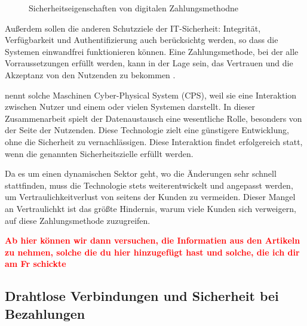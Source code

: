 \vfill
\begin{figure}[htb]
    \caption{Sicherheitseigenschaften von digitalen Zahlungsmethodne}
    \label{fig:refark_HARE}
\end{figure}
\vfill

Außerdem sollen die anderen Schutzziele der IT-Sicherheit: Integrität, Verfügbarkeit und
Authentifizierung auch berücksichtg werden, so dass die Systemen einwandfrei funktionieren können.
Eine Zahlungsmethode, bei der alle Vorraussetzungen erfüllt werden, kann in der Lage sein, das Vertrauen und 
die Akzeptanz von den Nutzenden zu bekommen \cite{refart:HARE}. 


\cite{inbook:MHNS} nennt solche Maschinen Cyber-Physical System (CPS), weil sie eine Interaktion zwischen 
Nutzer und einem oder vielen Systemen darstellt. In dieser Zusammenarbeit spielt der Datenaustausch 
eine wesentliche Rolle, besonders von der Seite der Nutzenden. Diese Technologie zielt eine günstigere 
Entwicklung, ohne die Sicherheit zu vernachlässigen. Diese Interaktion findet erfolgereich statt, 
wenn die genannten Sicherheitszielle erfüllt werden.


Da es um einen dynamischen Sektor geht, wo die Änderungen sehr schnell stattfinden, \cite{refip:NYRS} 
muss die Technologie stets weiterentwickelt und angepasst werden, um Vertraulichkeitverlust von seitens
der Kunden zu vermeiden. Dieser Mangel an Vertraulichkt ist das größte Hindernis, warum viele Kunden sich 
verweigern, auf diese Zahlungsmethode zuzugreifen.

\textbf{\textcolor{red}{Ab hier können wir dann versuchen, die Informatien aus den Artikeln zu nehmen, solche
die du hier hinzugefügt hast und solche, die ich dir am Fr schickte}}

\subsection{Drahtlose Verbindungen und Sicherheit bei Bezahlungen}

